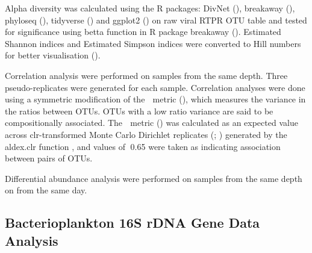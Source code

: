 \documentclass[a4,center,fleqn]{NAR}
\begin{document}
Alpha diversity was calculated using the R packages: DivNet (\cite{Willis305045}), breakaway (\cite{Willis:2015aa}), phyloseq (\cite{McMurdie:2013aa}), tidyverse (\cite{tidyverse}) and ggplot2 (\cite{ggplot2}) on raw viral RTPR OTU table and tested for significance using betta function in R package breakaway (\cite{Willis:2017aa}).
Estimated Shannon indices and Estimated Simpson indices were converted to Hill numbers for better visualisation (\cite{Kang:2016ab}).

Correlation analysis were performed on samples from the same depth.
Three pseudo-replicates were generated for each sample.
Correlation analyses were done using a symmetric modification of the 􏰓 metric (\cite{propr}), which measures the variance in the ratios between OTUs. OTUs with a low ratio variance are said to be compositionally associated. The 􏰓 metric (\cite{metric}) was calculated as an expected value across clr-transformed Monte Carlo Dirichlet replicates (\cite{propr}; \cite{Fernandes}) generated by the aldex.clr function , and values of 􏰏0.65 were taken as indicating association between pairs of OTUs.

Differential abundance analysis were performed on samples from the same depth on from the same day.

\subsection{Bacterioplankton 16S rDNA Gene Data Analysis}
\end{document}
